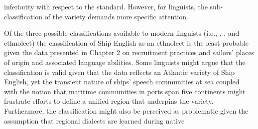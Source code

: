inferiority with respect to the standard. However, for linguists, the sub-classification of the variety demands more specific attention. 

Of the three possible  classifications available to modern linguists (i.e., , , and ethnolect) the classification of Ship English as an ethnolect is the least probable given the data presented in Chapter 2 on recruitment practices and sailors’ places of origin and associated language abilities. Some linguists might argue that the  classification is valid given that the data reflects an Atlantic variety of Ship English, yet the transient nature of ships’ speech communities at sea coupled with the notion that maritime communities in ports span five continents might frustrate efforts to define a unified region that underpins the variety. Furthermore, the  classification might also be perceived as problematic {given the assumption that regional dialects are} learned during native  

